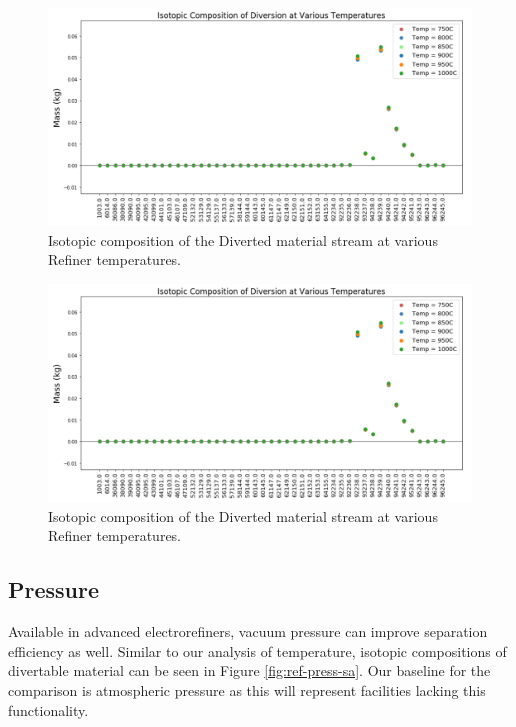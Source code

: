 \begin{figure}
	\includegraphics[width=\linewidth]{images/temp-sa-comp}
	\caption{Isotopic composition of the Diverted material stream at various Refiner temperatures.}
	\label{fig:ref-temp-sa}
\end{figure}

\begin{figure}
	\includegraphics[width=\linewidth]{images/temp-sa-comp}
	\caption{Isotopic composition of the Diverted material stream at various Refiner temperatures.}
	\label{fig:ref-temp-diff}
\end{figure}

\subsection{Pressure}

Available in advanced electrorefiners, vacuum pressure can improve separation efficiency as well. Similar to our analysis of temperature, isotopic compositions of
divertable material can be seen in Figure \ref{fig:ref-press-sa}. Our baseline for the comparison is atmospheric pressure as this will represent facilities lacking this
functionality. 

